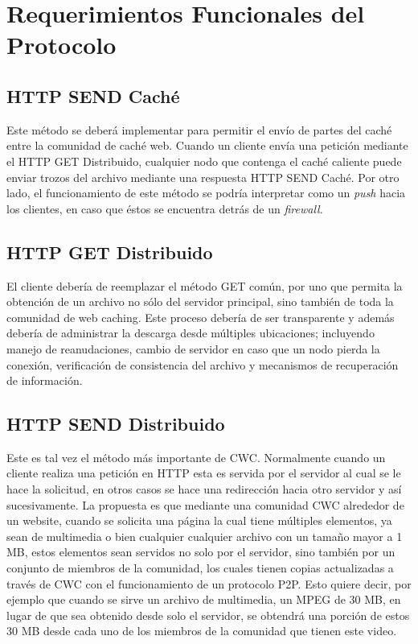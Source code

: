 \section{Requerimientos Funcionales del Protocolo}


\subsection{HTTP SEND Caché}
Este método se deberá implementar para permitir el envío de partes del caché entre la comunidad de caché web. Cuando un cliente envía una petición mediante el HTTP GET Distribuido, cualquier nodo que contenga el caché caliente puede enviar trozos del archivo mediante una respuesta HTTP SEND Caché. Por otro lado, el funcionamiento de este método se podría interpretar como un \textit{push} hacia los clientes, en caso que éstos se encuentra detrás de un \textit{firewall}. 

\subsection{HTTP GET Distribuido}
El cliente debería de reemplazar el método GET común, por uno que permita la obtención de un archivo no sólo del servidor principal, sino también de toda la comunidad de web caching. Este proceso debería de ser transparente y además debería de administrar la descarga desde múltiples ubicaciones; incluyendo manejo de reanudaciones, cambio de servidor en caso que un nodo pierda la conexión, verificación de consistencia del archivo y mecanismos de recuperación de información.

\subsection{HTTP SEND Distribuido}
Este es tal vez el método más importante de CWC. Normalmente cuando un cliente realiza una petición en HTTP esta es servida por el servidor al cual se le hace la solicitud, en otros casos se hace una redirección hacia otro servidor y así sucesivamente. La propuesta es que mediante una comunidad CWC alrededor de un website, cuando se solicita una página la cual tiene múltiples elementos, ya sean de multimedia o bien cualquier cualquier archivo con un tamaño mayor a 1 MB, estos elementos sean servidos no solo por el servidor, sino también por un conjunto de miembros de la comunidad, los cuales tienen copias actualizadas a través de CWC con el funcionamiento de un protocolo P2P. Esto quiere decir, por ejemplo que cuando se sirve un archivo de multimedia, un MPEG de 30 MB, en lugar de que sea obtenido desde solo el servidor, se obtendrá una porción de estos 30 MB desde cada uno de los miembros de la comunidad que tienen este video.

